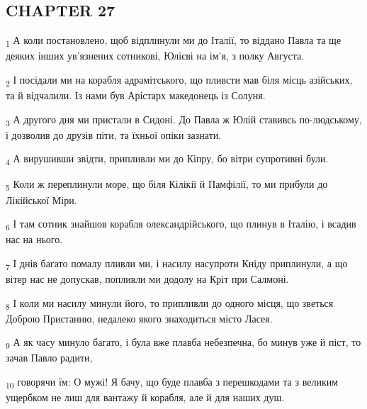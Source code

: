 \subsection{CHAPTER 27}
\begin{tcolorbox}
\textsubscript{1} А коли постановлено, щоб відплинули ми до Італії, то віддано Павла та ще деяких інших ув'язнених сотникові, Юлієві на ім'я, з полку Августа.
\end{tcolorbox}
\begin{tcolorbox}
\textsubscript{2} І посідали ми на корабля адрамітського, що пливсти мав біля місць азійських, та й відчалили. Із нами був Арістарх македонець із Солуня.
\end{tcolorbox}
\begin{tcolorbox}
\textsubscript{3} А другого дня ми пристали в Сидоні. До Павла ж Юлій ставивсь по-людському, і дозволив до друзів піти, та їхньої опіки зазнати.
\end{tcolorbox}
\begin{tcolorbox}
\textsubscript{4} А вирушивши звідти, припливли ми до Кіпру, бо вітри супротивні були.
\end{tcolorbox}
\begin{tcolorbox}
\textsubscript{5} Коли ж переплинули море, що біля Кілікії й Памфілії, то ми прибули до Лікійської Міри.
\end{tcolorbox}
\begin{tcolorbox}
\textsubscript{6} І там сотник знайшов корабля олександрійського, що плинув в Італію, і всадив нас на нього.
\end{tcolorbox}
\begin{tcolorbox}
\textsubscript{7} І днів багато помалу пливли ми, і насилу насупроти Кніду приплинули, а що вітер нас не допускав, попливли ми додолу на Кріт при Салмоні.
\end{tcolorbox}
\begin{tcolorbox}
\textsubscript{8} І коли ми насилу минули його, то припливли до одного місця, що зветься Доброю Пристанню, недалеко якого знаходиться місто Ласея.
\end{tcolorbox}
\begin{tcolorbox}
\textsubscript{9} А як часу минуло багато, і була вже плавба небезпечна, бо минув уже й піст, то зачав Павло радити,
\end{tcolorbox}
\begin{tcolorbox}
\textsubscript{10} говорячи їм: О мужі! Я бачу, що буде плавба з перешкодами та з великим ущербком не лиш для вантажу й корабля, але й для наших душ.
\end{tcolorbox}
